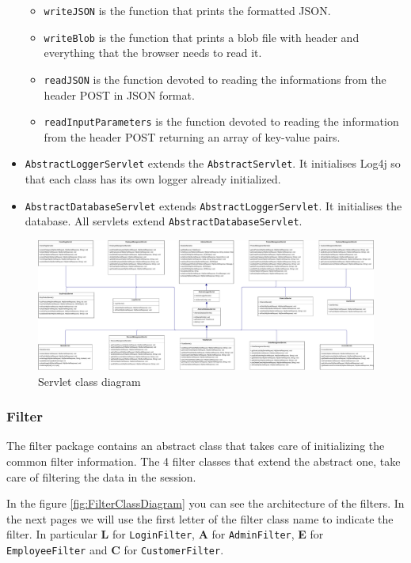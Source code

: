 \begin{itemize}
\begin{itemize}
        \item \texttt{writeJSON} is the function that prints the formatted JSON.
        \item \texttt{writeBlob} is the function that prints a blob file with
        header and everything that the browser needs to read it.
        \item \texttt{readJSON}  is the function devoted to reading the informations
        from the header POST in JSON format.
        \item \texttt{readInputParameters} is the function devoted to reading the
        information from the header POST returning an array of key-value pairs.
    \end{itemize}
    \item \texttt{AbstractLoggerServlet} extends the \texttt{AbstractServlet}. It initialises Log4j
    so that each class has its own logger already initialized.
    \item \texttt{AbstractDatabaseServlet} extends \texttt{AbstractLoggerServlet}. It initialises the database.
    All servlets extend \texttt{AbstractDatabaseServlet}.
\end{itemize}


\begin{figure}
    \centering
    \includegraphics[width=1.1\textwidth,height=\textheight,keepaspectratio]{Schemas/servlet.drawio.pdf}
    \caption{Servlet class diagram}
    \label{fig:ServletClassDiagram}
\end{figure}

\subsubsection*{Filter}

    
The filter package contains an abstract class that takes care of
initializing the common filter information. The 4 filter classes that
extend the abstract one, take care of filtering the data in the session.

In the figure \ref{fig:FilterClassDiagram} you can see the architecture 
of the filters. In the next pages we will use
the first letter of the filter class name to indicate the filter.
In particular \textbf{L} for \texttt{LoginFilter}, 
\textbf{A} for \texttt{AdminFilter}, \textbf{E} for 
\texttt{EmployeeFilter} and \textbf{C} for \texttt{CustomerFilter}.

